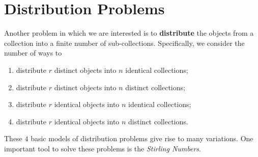 \documentclass[math]{amznotes}
\theoremstyle{remark}
\begin{document}
\section{Distribution Problems}
Another problem in which we are interested is to \textbf{distribute} the objects from a collection into a finite number of sub-collections. Specifically, we consider the number of ways to
\begin{enumerate}
    \item distribute $r$ distinct objects into $n$ identical collections;
    \item distribute $r$ distinct objects into $n$ distinct collections;
    \item distribute $r$ identical objects into $n$ identical collections;
    \item distribute $r$ identical objects into $n$ distinct collections.
\end{enumerate}
These $4$ basic models of distribution problems give rise to many variations. One important tool to solve these problems is the \textit{Stirling Numbers}.
\end{document}
